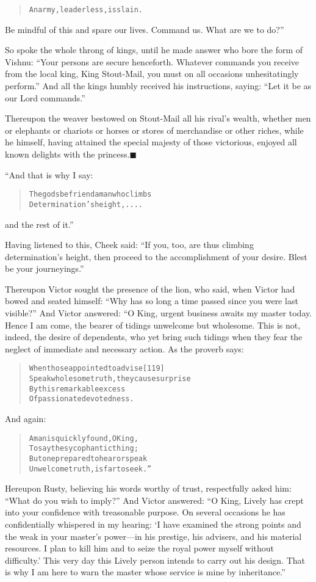 \documentclass[article, twoside, 14pt]{memoir}
\newcommand{\qed}{\hfill \ensuremath{\blacksquare}}
\renewenvironment{verbatim}{%
\begin{quote}%
\vskip -10pt%
\begin{alltt}\normalfont\large}{\end{alltt}%
\end{quote}%
\vskip -10pt
} %
\begin{document}
\begin{verbatim}
An army, leaderless, is slain.
\end{verbatim}
Be mindful of this and spare our lives. Command us. What are we to
do?”

So spoke the whole throng of kings, until he made answer who bore
the form of Vishnu:
``Your persons are secure henceforth. Whatever commands you receive from the local king, King Stout-Mail, you must on all occasions unhesitatingly perform.''
And all the kings humbly received his instructions, saying:
``Let it be as our Lord commands.''

Thereupon the weaver bestowed on Stout-Mail all his rival's wealth,
whether men or elephants or chariots or horses or stores of
merchandise or other riches, while he himself, having attained the
special majesty of those victorious, enjoyed all known delights
with the princess.\hyperref[s11]{\qed}

“And that is why I say:

\begin{verbatim}
The gods befriend a man who climbs
    Determination's height, ....
\end{verbatim}
and the rest of it.”

Having listened to this, Cheek said:
``If you, too, are thus climbing determination's height, then proceed to the accomplishment of your desire. Blest be your journeyings.''

Thereupon Victor sought the presence of the lion, who said, when
Victor had bowed and seated himself:
``Why has so long a time passed since you were last visible?'' And
Victor answered: “O King, urgent business awaits my master today.
Hence I am come, the bearer of tidings unwelcome but wholesome.
This is not, indeed, the desire of dependents, who yet bring such
tidings when they fear the neglect of immediate and necessary
action. As the proverb says:

\begin{verbatim}
When those appointed to advise                          [119]
Speak wholesome truth, they cause surprise
By this remarkable excess
Of passionate devotedness.
\end{verbatim}
And again:

\begin{verbatim}
A man is quickly found, O King,
To say the sycophantic thing;
But one prepared to hear or speak
Unwelcome truth, is far to seek.”
\end{verbatim}
Hereupon Rusty, believing his words worthy of trust, respectfully
asked him: ``What do you wish to imply?'' And Victor answered:
``O King, Lively has crept into your confidence with treasonable purpose. On several occasions he has confidentially whispered in my hearing: `I have examined the strong points and the weak in your master's power---in his prestige, his advisers, and his material resources. I plan to kill him and to seize the royal power myself without difficulty.' This very day this Lively person intends to carry out his design. That is why I am here to warn the master whose service is mine by inheritance.''
\end{document}
